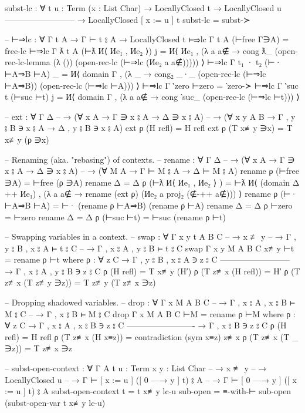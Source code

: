 \documentclass[logo,bsc,singlespacing,parskip,online]{infthesis}
\renewenvironment{code}{\mintedcopy[breaklines,breaksymbolleft=\;]{agda}}{\endmintedcopy}
\begin{document}
\begin{code}
subst-lc : ∀ {t u : Term} (x : List Char)
  → LocallyClosed t
  → LocallyClosed u
    --------------------------
  → LocallyClosed [ x := u ] t
subst-lc = subst-≻

-- ⊢⇒lc : ∀ {Γ t A} → Γ ⊢ t ⦂ A → LocallyClosed t
⊢⇒lc {Γ} {t} {A} (⊢free Γ∋A) = free-lc
⊢⇒lc {Γ} {ƛ t} {A} (⊢ƛ И⟨ Иe₁ ,  Иe₂ ⟩) j =
  И⟨ Иe₁ , (λ a {a∉} → cong ƛ_ (open-rec-lc-lemma (λ ()) (open-rec-lc (⊢⇒lc (Иe₂ a {a∉}))))) ⟩
⊢⇒lc {Γ} {t₁ · t₂} (⊢· ⊢A⇒B ⊢A) _ =
  И⟨ domain Γ , (λ _ → cong₂ _·_ (open-rec-lc (⊢⇒lc ⊢A⇒B)) (open-rec-lc (⊢⇒lc ⊢A))) ⟩
⊢⇒lc {Γ} {‵zero} ⊢zero = ‵zero-≻
⊢⇒lc {Γ} {‵suc t} (⊢suc ⊢t) j = И⟨ domain Γ , (λ a {a∉} → cong ‵suc_ (open-rec-lc (⊢⇒lc ⊢t))) ⟩

-- ext : ∀ {Γ Δ}
--   → (∀ {x A}     →         Γ ∋ x ⦂ A →         Δ ∋ x ⦂ A)
--   → (∀ {x y A B} → Γ , y ⦂ B ∋ x ⦂ A → Δ , y ⦂ B ∋ x ⦂ A)
ext ρ (H refl) = H refl
ext ρ (T x≢y ∋x) = T x≢y (ρ ∋x)

-- Renaming (aka. "rebasing") of contexts.
-- rename : ∀ {Γ Δ}
--   → (∀ {x A} → Γ ∋ x ⦂ A → Δ ∋ x ⦂ A)
--   → (∀ {M A} → Γ ⊢ M ⦂ A → Δ ⊢ M ⦂ A)
rename ρ (⊢free ∋A) = ⊢free (ρ ∋A)
rename {Δ = Δ} ρ (⊢ƛ И⟨ Иe₁ , Иe₂ ⟩ ) =
  ⊢ƛ
    И⟨ (domain Δ ++ Иe₁)
    , (λ a {a∉} → rename (ext ρ) (Иe₂ a {proj₂ (∉-++ a∉)})) ⟩
rename ρ (⊢· ⊢A⇒B ⊢A) = ⊢· (rename ρ ⊢A⇒B) (rename ρ ⊢A)
rename {Δ = Δ} ρ ⊢zero = ⊢zero
rename {Δ = Δ} ρ (⊢suc ⊢t) = ⊢suc (rename ρ ⊢t)

-- Swapping variables in a context.
-- swap : ∀ {Γ x y t A B C}
--   → x ≢ y
--   → Γ , y ⦂ B , x ⦂ A ⊢ t ⦂ C
--   → Γ , x ⦂ A , y ⦂ B ⊢ t ⦂ C
swap {Γ} {x} {y} {M} {A} {B} {C} x≢y ⊢t = rename ρ ⊢t
  where
    ρ : ∀ {z C}
      → Γ , y ⦂ B , x ⦂ A ∋ z ⦂ C
        --------------------------
      → Γ , x ⦂ A , y ⦂ B ∋ z ⦂ C
    ρ (H refl) = T x≢y (H′)
    ρ (T z≢x (H refl)) = H′
    ρ (T z≢x (T z≢y ∋z)) = T z≢y (T z≢x ∋z)

-- Dropping shadowed variables.
-- drop : ∀ {Γ x M A B C}
--   → Γ , x ⦂ A , x ⦂ B ⊢ M ⦂ C
--   → Γ , x ⦂ B ⊢ M ⦂ C
drop {Γ} {x} {M} {A} {B} {C} ⊢M = rename ρ ⊢M
  where
    ρ : ∀ {z C}
      → Γ , x ⦂ A , x ⦂ B ∋ z ⦂ C
        -------------------------
      → Γ , x ⦂ B ∋ z ⦂ C
    ρ (H refl) = H refl
    ρ (T z≢x (H x≡z)) = contradiction (sym x≡z) z≢x
    ρ (T z≢x (T _ ∋z)) = T z≢x ∋z

-- subst-open-context : ∀ {Γ A} {t u : Term} {x y : List Char}
--   → x ≢ y
--   → LocallyClosed u
--   → Γ ⊢ [ x := u ] ([ 0 —→ y ] t) ⦂ A
--   → Γ ⊢ [ 0 —→ y ] ([ x := u ] t) ⦂ A
subst-open-context {t = t} x≢y lc-u sub-open = ≡-with-⊢ sub-open (subst-open-var t x≢y lc-u)
\end{code}
\end{document}
